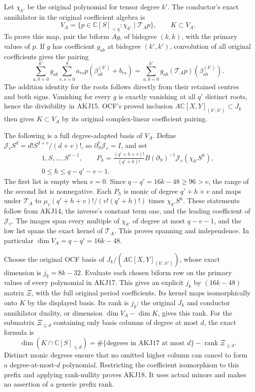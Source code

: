 \documentclass[11pt,a4paper]{article}
\begin{document}
Let $\chi_{k'}$ be the original polynomial for tensor degree $k'$.
The conductor's exact annihilator in the original coefficient algebra is
\[
 V_A=\{p\in\mathbb C[S]_{<q}:\chi_{k'}\mid\mathcal T_Ap\},
 \qquad K\subset V_A.
 \tag{AKJ15}
\]
To prove this map, pair the biform $Ag$, of bidegree $(k,k)$, with
the primary values of $p$. If $g$ has coefficient $g_{ab}$ at bidegree
$(k',k')$, convolution of all original coefficients gives the pairing
\[
 \sum_{a,b=0}^{k'}g_{ab}
       \sum_{r,s=0}^8a_{rs}
       p(\beta^{(k')}_{ab}+b_{rs})
 =\sum_{a,b=0}^{k'}g_{ab}
                      (\mathcal T_Ap)(\beta^{(k')}_{ab}).
 \tag{AKJ16}
\]
The addition identity for the roots follows directly from their retained
centres and both signs. Vanishing for every $g$ is exactly vanishing at
all $q'$ distinct roots, hence the divisibility in AKJ15. OCF's proved
inclusion $A\mathbb C[X,Y]_{(k',k')}\subset J_k$ then gives $K\subset V_A$
by its original complex-linear coefficient pairing.

The following is a full degree-adapted basis of $V_A$. Define
$\mathcal J_v S^d=d!S^{d+v}/(d+v)!$, so
$\partial_S^v\mathcal J_v=I$, and set
\[
 \begin{gathered}
 1,S,\ldots,S^{v-1},\qquad
 P_h=\frac{(q'+h+v)!}{(q'+h)!}
       B(\partial_S)^{-1}\mathcal J_v(\chi_{k'}S^h),\\
 0\le h\le q-q'-v-1.
 \end{gathered}\tag{AKJ17}
\]
The first list is empty when $v=0$. Since $q-q'=16k-48\ge96>v$,
the range of the second list is nonnegative. Each $P_h$ is monic of
degree $q'+h+v$ and maps under $\mathcal T_A$ to
$\mu_v(q'+h+v)!/(v!(q'+h)!)$ times $\chi_{k'}S^h$. These statements
follow from AKJ14, the inverse's constant term one, and the leading
coefficient of $\mathcal J_v$. The images span every multiple of
$\chi_{k'}$ of degree at most $q-v-1$, and the low list spans the exact
kernel of $\mathcal T_A$. This proves spanning and independence. In
particular $\dim V_A=q-q'=16k-48$.

Choose the original OCF basis of $J_k/(A\mathbb C[X,Y]_{(k',k')})$,
whose exact dimension is $j_k=8k-32$. Evaluate each chosen biform row
on the primary values of every polynomial in AKJ17. This gives an
explicit $j_k$ by $(16k-48)$ matrix $\Xi$, with the full original
period coefficients. Its kernel maps isomorphically onto $K$ by the
displayed basis. Its rank is $j_k$: the original $J_k$ and conductor
annihilator duality, or dimension $\dim V_A-\dim K$, gives this rank.
For the submatrix $\Xi_{\le d}$ containing only basis columns of degree
at most $d$, the exact formula is
\[
 \dim(K\cap\mathbb C[S]_{\le d})
 =\#\{\text{degrees in AKJ17 at most }d\}
                      -\operatorname{rank}\Xi_{\le d}.
 \tag{AKJ18}
\]
Distinct monic degrees ensure that no omitted higher column can cancel
to form a degree-at-most-$d$ polynomial. Restricting the coefficient
isomorphism to this prefix and applying rank-nullity proves AKJ18.
It uses actual minors and makes no assertion of a generic prefix rank.
\end{document}
